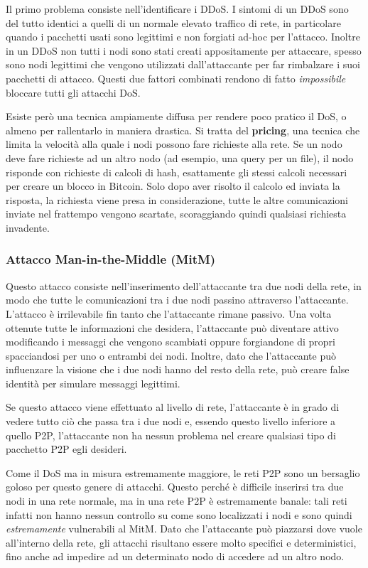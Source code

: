 Il primo problema consiste nell'identificare i DDoS. I sintomi di un DDoS sono del tutto identici a quelli di un normale elevato traffico di rete, in particolare quando i pacchetti usati sono legittimi e non forgiati ad-hoc per l'attacco. Inoltre in un DDoS non tutti i nodi sono stati creati appositamente per attaccare, spesso sono nodi legittimi che vengono utilizzati dall'attaccante per far rimbalzare i suoi pacchetti di attacco. Questi due fattori combinati rendono di fatto \emph{impossibile} bloccare tutti gli attacchi DoS.

Esiste però una tecnica ampiamente diffusa per rendere poco pratico il DoS, o almeno per rallentarlo in maniera drastica. Si tratta del \textbf{pricing}, una tecnica che limita la velocità alla quale i nodi possono fare richieste alla rete. Se un nodo deve fare richieste ad un altro nodo (ad esempio, una query per un file), il nodo risponde con richieste di calcoli di hash, esattamente gli stessi calcoli necessari per creare un blocco in Bitcoin. Solo dopo aver risolto il calcolo ed inviata la risposta, la richiesta viene presa in considerazione, tutte le altre comunicazioni inviate nel frattempo vengono scartate, scoraggiando quindi qualsiasi richiesta invadente.

\subsubsection{Attacco Man-in-the-Middle (MitM)}\label{attacco-man-in-the-middle-mitm}

Questo attacco consiste nell'inserimento dell'attaccante tra due nodi della rete, in modo che tutte le comunicazioni tra i due nodi passino attraverso l'attaccante. L'attacco è irrilevabile fin tanto che l'attaccante rimane passivo. Una volta ottenute tutte le informazioni che desidera, l'attaccante può diventare attivo modificando i messaggi che vengono scambiati oppure forgiandone di propri spacciandosi per uno o entrambi dei nodi. Inoltre, dato che l'attaccante può influenzare la visione che i due nodi hanno del resto della rete, può creare false identità per simulare messaggi legittimi.

Se questo attacco viene effettuato al livello di rete, l'attaccante è in grado di vedere tutto ciò che passa tra i due nodi e, essendo questo livello inferiore a quello P2P, l'attaccante non ha nessun problema nel creare qualsiasi tipo di pacchetto P2P egli desideri.

Come il DoS ma in misura estremamente maggiore, le reti P2P sono un bersaglio goloso per questo genere di attacchi. Questo perché è difficile inserirsi tra due nodi in una rete normale, ma in una rete P2P è estremamente banale: tali reti infatti non hanno nessun controllo su come sono localizzati i nodi e sono quindi \emph{estremamente} vulnerabili al MitM.
Dato che l'attaccante può piazzarsi dove vuole all'interno della rete, gli attacchi risultano essere molto specifici e deterministici, fino anche ad impedire ad un determinato nodo di accedere ad un altro nodo.

